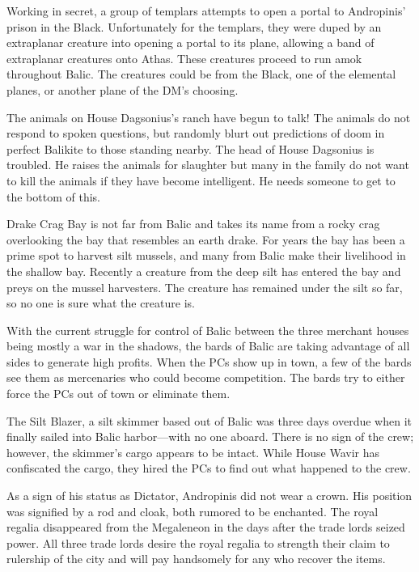 {
	\item Working in secret, a group of templars attempts to open a portal to Andropinis' prison in the Black. Unfortunately for the templars, they were duped by an extraplanar creature into opening a portal to its plane, allowing a band of extraplanar creatures onto Athas. These creatures proceed to run amok throughout Balic. The creatures could be from the Black, one of the elemental planes, or another plane of the DM's choosing.
	\item The animals on House Dagsonius's ranch have begun to talk! The animals do not respond to spoken questions, but randomly blurt out predictions of doom in perfect Balikite to those standing nearby. The head of House Dagsonius is troubled. He raises the animals for slaughter but many in the family do not want to kill the animals if they have become intelligent. He needs someone to get to the bottom of this.
	\item Drake Crag Bay is not far from Balic and takes its name from a rocky crag overlooking the bay that resembles an earth drake. For years the bay has been a prime spot to harvest silt mussels, and many from Balic make their livelihood in the shallow bay. Recently a creature from the deep silt has entered the bay and preys on the mussel harvesters. The creature has remained under the silt so far, so no one is sure what the creature is.
	\item With the current struggle for control of Balic between the three merchant houses being mostly a war in the shadows, the bards of Balic are taking advantage of all sides to generate high profits. When the PCs show up in town, a few of the bards see them as mercenaries who could become competition. The bards try to either force the PCs out of town or eliminate them.
	\item The Silt Blazer, a silt skimmer based out of Balic was three days overdue when it finally sailed into Balic harbor---with no one aboard. There is no sign of the crew; however, the skimmer's cargo appears to be intact. While House Wavir has confiscated the cargo, they hired the PCs to find out what happened to the crew.
	\item As a sign of his status as Dictator, Andropinis did not wear a crown. His position was signified by a rod and cloak, both rumored to be enchanted. The royal regalia disappeared from the Megaleneon in the days after the trade lords seized power. All three trade lords desire the royal regalia to strength their claim to rulership of the city and will pay handsomely for any who recover the items.
}